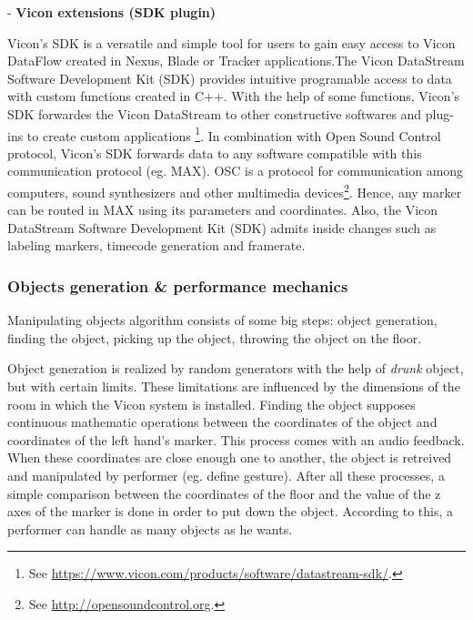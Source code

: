\documentclass{nime-alternate}
\begin{document}
- \textbf{Vicon extensions (SDK plugin)} \par
Vicon's SDK is a versatile and simple tool for users to gain easy access to Vicon DataFlow created in Nexus, Blade or Tracker applications.The Vicon DataStream Software Development Kit (SDK) provides intuitive programable access to data with custom functions created in C++. With the help of some functions, Vicon's SDK forwardes the Vicon DataStream to other constructive softwares and plug-ins to create custom applications \footnote{See \url{https://www.vicon.com/products/software/datastream-sdk/}.}. In combination with Open Sound Control protocol, Vicon's SDK forwards data to any software compatible with this communication protocol (eg. MAX). OSC is a protocol for communication among computers, sound synthesizers and other multimedia devices\footnote{See  \url{http://opensoundcontrol.org}.}. Hence, any marker can be routed in MAX using its parameters and coordinates. Also, the Vicon DataStream Software Development Kit (SDK) admits inside changes such as labeling markers, timecode generation and framerate.

\subsubsection{Objects generation \& performance mechanics}
Manipulating objects algorithm consists of some big steps: object generation, finding the object, picking up the object, throwing the object on the floor. 

Object generation is realized by random generators with the help of \textit{drunk} object, but with certain limits. These limitations are influenced by the dimensions of the room in which the Vicon system is installed. Finding the object supposes continuous mathematic operations between the coordinates of the object and coordinates of the left hand's marker. This process comes with an audio feedback. When these coordinates are close enough one to another, the object is retreived and manipulated by performer (eg. define gesture). After all these processes, a simple comparison between the coordinates of the floor and the value of the z axes of the marker is done in order to put down the object. According to this, a performer can handle as many objects as he wants.\\ \par
\end{document}
